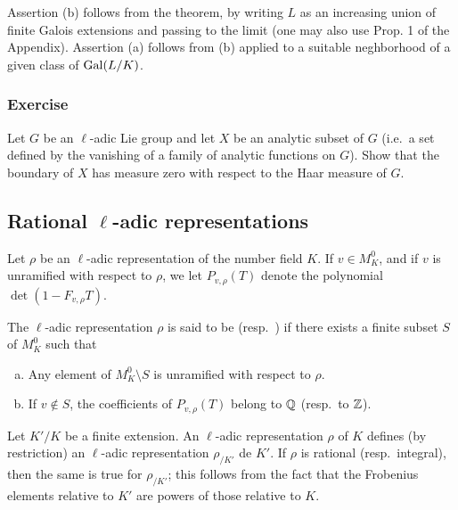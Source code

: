 Assertion (b) follows from the theorem, by writing $L$ as an increasing union
of finite Galois extensions and passing to the limit (one may also use Prop. 1
of the Appendix). Assertion (a) follows from (b) applied to a suitable
neghborhood of a given class of $\operatorname{Gal}(L/K)$.

\subsubsection*{Exercise}
Let $G$ be an $\ell$-adic Lie group and let $X$ be an analytic subset of $G$
(i.e.\ a set defined by the vanishing of a family of analytic functions on $G$).
Show that the boundary of $X$ has measure zero
\dpage
with respect to the Haar measure of $G$.

\subsection{Rational \texorpdfstring{$\ell$}{l}-adic representations}
\label{sec:I_23}
Let $\rho$ be an $\ell$-adic representation of the number field $K$. If $v \in
M_K^0$, and if $v$ is unramified with respect to $\rho$, we let $P_{v,\rho}(T)$
denote the polynomial $\det(1 - F_{v,\rho} T)$.

\begin{mydef}
The $\ell$-adic representation $\rho$ is said to be
 (resp.\ 
) if there exists a finite
subset $S$ of $M_K^0$ such that
\begin{enumerate}[(a)]
	\item Any element of $M_K^0 \setminus S$ is unramified with respect to 
	$\rho$.
	\item If $v \not\in S$, the coefficients of $P_{v,\rho}(T)$ belong to
		$\mathbb{Q}$ (resp.\ to $\mathbb{Z}$).
\end{enumerate}
\end{mydef}

\begin{obs}\label{rmk:I_23_1}
	Let $K'/K$ be a finite extension. An $\ell$-adic representation $\rho$
	of $K$ defines (by restriction) an $\ell$-adic representation
	$\rho_{/K'}$ de $K'$. If $\rho$ is rational (resp.\ integral), then the
	same is true for $\rho_{/K'}$; this follows from the fact that the
	Frobenius elements relative to $K'$ are powers of those relative to
	$K$.
\end{obs}

